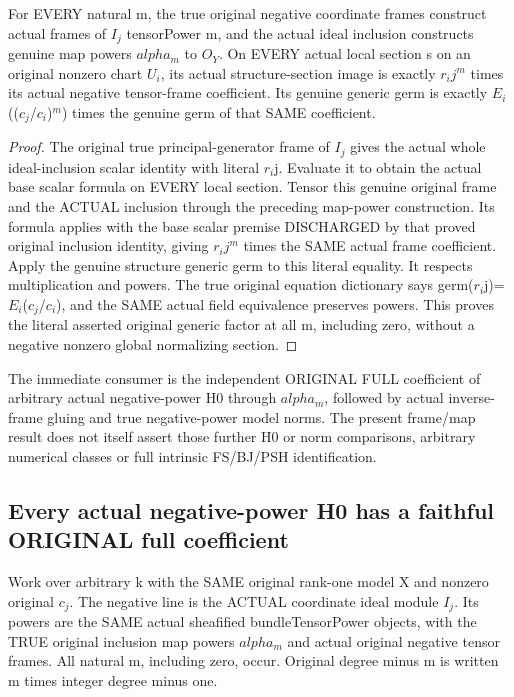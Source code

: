\begin{theorem}
\label{thm:seven-native-negative-tensor-inclusion-frames}
\leanok
For EVERY natural m, the true original negative coordinate frames
construct actual frames of $I_j$ tensorPower m, and the actual ideal
inclusion constructs genuine map powers $alpha_m$ to $O_Y$. On EVERY
actual local section s on an original nonzero chart $U_i$, its actual
structure-section image is exactly $r_i$$j^m$ times its actual negative
tensor-frame coefficient. Its genuine generic germ is exactly
$E_i$(($c_j$/$c_i$)$^m$) times the genuine germ of that SAME coefficient.
\end{theorem}
\begin{proof}
The original true principal-generator frame of $I_j$ gives the actual
whole ideal-inclusion scalar identity with literal $r_i$j. Evaluate it
to obtain the actual base scalar formula on EVERY local section.
Tensor this genuine original frame and the ACTUAL inclusion through
the preceding map-power construction. Its formula applies with the
base scalar premise DISCHARGED by that proved original inclusion
identity, giving $r_i$$j^m$ times the SAME actual frame coefficient.
Apply the genuine structure generic germ to this literal equality.
It respects multiplication and powers. The true original equation
dictionary says germ($r_i$j)=$E_i$($c_j$/$c_i$), and the SAME actual field
equivalence preserves powers. This proves the literal asserted
original generic factor at all m, including zero, without a negative
nonzero global normalizing section.
\end{proof}

The immediate consumer is the independent ORIGINAL FULL coefficient
of arbitrary actual negative-power H0 through $alpha_m$, followed by
actual inverse-frame gluing and true negative-power model norms.
The present frame/map result does not itself assert those further
H0 or norm comparisons, arbitrary numerical classes or full intrinsic
FS/BJ/PSH identification.

\subsection{Every actual negative-power H0 has a faithful ORIGINAL full coefficient}
Work over arbitrary k with the SAME original rank-one model X and
nonzero original $c_j$. The negative line is the ACTUAL coordinate ideal
module $I_j$. Its powers are the SAME actual sheafified bundleTensorPower
objects, with the TRUE original inclusion map powers $alpha_m$ and actual
original negative tensor frames. All natural m, including zero, occur.
Original degree minus m is written m times integer degree minus one.

